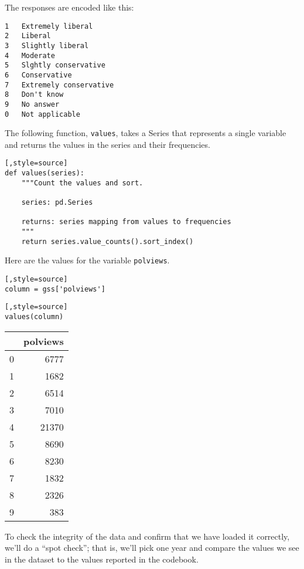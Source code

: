 The responses are encoded like this:

\begin{lstlisting}[style=output]
1   Extremely liberal
2   Liberal
3   Slightly liberal
4   Moderate
5   Slghtly conservative
6   Conservative
7   Extremely conservative
8   Don't know
9   No answer
0   Not applicable
\end{lstlisting}

The following function, \passthrough{\lstinline!values!}, takes a Series
that represents a single variable and returns the values in the series
and their frequencies.

\begin{lstlisting}[,style=source]
def values(series):
    """Count the values and sort.
    
    series: pd.Series
    
    returns: series mapping from values to frequencies
    """
    return series.value_counts().sort_index()
\end{lstlisting}

Here are the values for the variable \passthrough{\lstinline!polviews!}.

\begin{lstlisting}[,style=source]
column = gss['polviews']
\end{lstlisting}

\begin{lstlisting}[,style=source]
values(column)
\end{lstlisting}

\begin{tabular}{lr}
\midrule
{} &  polviews \\
\midrule
0 &      6777 \\
1 &      1682 \\
2 &      6514 \\
3 &      7010 \\
4 &     21370 \\
5 &      8690 \\
6 &      8230 \\
7 &      1832 \\
8 &      2326 \\
9 &       383 \\
\midrule
\end{tabular}

To check the integrity of the data and confirm that we have loaded it
correctly, we'll do a ``spot check''; that is, we'll pick one year and
compare the values we see in the dataset to the values reported in the
codebook.


